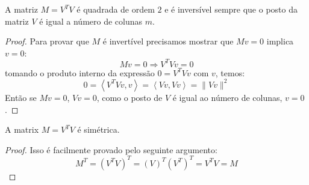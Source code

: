 % 

\begin{teo}
A matriz $M=V^TV$ é quadrada de ordem $2$ e é inversível sempre que o posto da matriz $V$ é igual a número de colunas $m$.
\end{teo}
\begin{proof}
Para provar que $M$ é invertível precisamos mostrar que $Mv=0$ implica $v=0$:
$$Mv=0\Longrightarrow V^TVv=0$$
tomando o produto interno da expressão $0=V^TVv$ com $v$, temos:
$$0=\left<V^TVv,v\right>=\left<Vv,Vv\right>=\|Vv\|^2$$
Então se $Mv=0$, $Vv=0$, como o posto de $V$ é igual ao número de colunas, $v=0$.
\end{proof}
\begin{lem}
 A matrix $M=V^TV$ é simétrica.
\end{lem}
\begin{proof}
Isso é facilmente provado pelo seguinte argumento:
$$M^T=(V^TV)^T=(V)^T(V^T)^T=V^TV=M$$
\end{proof}




